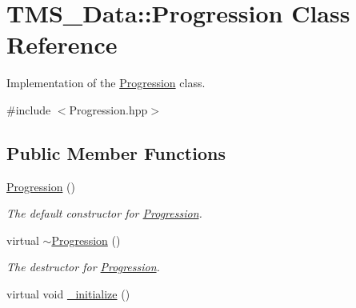 \hypertarget{classTMS__Data_1_1Progression}{
\section{TMS\_\-Data::Progression Class Reference}
\label{classTMS__Data_1_1Progression}
}


Implementation of the \hyperlink{classTMS__Data_1_1Progression}{Progression} class.  




{\ttfamily \#include $<$Progression.hpp$>$}

\subsection*{Public Member Functions}
\begin{DoxyCompactItemize}
\item 
\hypertarget{classTMS__Data_1_1Progression_afbeb3429659d6c1a501ae48dd1879380}{
\hyperlink{classTMS__Data_1_1Progression_afbeb3429659d6c1a501ae48dd1879380}{Progression} ()}
\label{classTMS__Data_1_1Progression_afbeb3429659d6c1a501ae48dd1879380}

\begin{DoxyCompactList}\small\item\em The default constructor for \hyperlink{classTMS__Data_1_1Progression}{Progression}. \item\end{DoxyCompactList}\item 
\hypertarget{classTMS__Data_1_1Progression_ae5653d21cece1bbfb235f1a42bcf5d32}{
virtual \hyperlink{classTMS__Data_1_1Progression_ae5653d21cece1bbfb235f1a42bcf5d32}{$\sim$Progression} ()}
\label{classTMS__Data_1_1Progression_ae5653d21cece1bbfb235f1a42bcf5d32}

\begin{DoxyCompactList}\small\item\em The destructor for \hyperlink{classTMS__Data_1_1Progression}{Progression}. \item\end{DoxyCompactList}\item 
\hypertarget{classTMS__Data_1_1Progression_aa3f31f65004abe8240ba1ee56faa718f}{
virtual void \hyperlink{classTMS__Data_1_1Progression_aa3f31f65004abe8240ba1ee56faa718f}{\_\-initialize} ()}
\label{classTMS__Data_1_1Progression_aa3f31f65004abe8240ba1ee56faa718f}


\end{DoxyCompactItemize}
